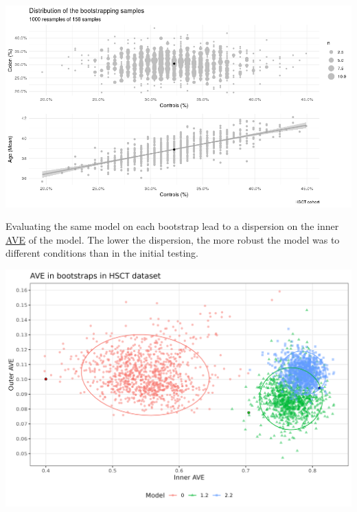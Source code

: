 \documentclass[
  12pt,
  a4paper,
  twoside,
  openright]{book}
\let\origfigure\figure
\let\endorigfigure\endfigure
\renewenvironment{figure}[1][2] {
    \expandafter\origfigure\expandafter[!htbp]
} {
    \endorigfigure
}
\begin{document}
\begin{figure}
\includegraphics[width=1\linewidth]{images/hsct-bootstrap-characteristics} \caption[Characteristics of the samples from the HSCT bootstraped samples.]{Characteristics of the samples from the HSCT bootstraped samples. Dispersion of the bootstraped samples on age and percentage of colon and controls samples. The bootstraps represent a wide range of different composition.}\label{fig:hsct-bootstrap-quality}
\end{figure}

Evaluating the same model on each bootstrap lead to a dispersion on the inner \protect\hyperlink{acronyms_AVE}{AVE} of the model.
The lower the dispersion, the more robust the model was to different conditions than in the initial testing.

\begin{figure}
\includegraphics[width=1\linewidth]{images/hsct_bootstrap_models} \caption[Bootstrap results from the HSCT dataset.]{Bootstrap results from the HSCT dataset. Bootstrap of the models 0, 1.2 and 2.2 in the HSCT dataset. Model 0 and 1.2 have lower inner and outer AVE score, model 2.2 has lower outer score but higher inner value than the bootstrapped. Each point represents a bootstrapped sample (colored by model used). The dispersion is shown by the ellipses. The point with the black circle is the AVE of the original data.}\label{fig:hsct-bootstrap}
\end{figure}
\end{document}
